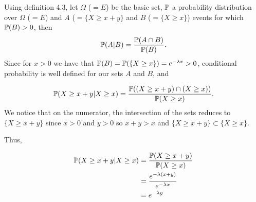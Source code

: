 
Using definition 4.3, let $ \Omega $ ($ = E$) be the basic set, $ \P$ a probability distribution over $
\Omega $ ($ =E$) and $ A$ ($ = \{ X \geq x+y \} $ and $ B$ ($ = \{ X \geq x \} $) events for which
$ \P(B) > 0$, then 
\[
    \P(A |B) = \frac{\P(A \cap B)}{\P(B)} 
.\] 
Since for $ x > 0$ we have that $ \P(B) = \P( \{ X \geq x \} ) = e^{-\lambda x} > 0 $,
conditional probability is well defined for our sets $ A$ and $ B$, and 

\[
    \P( X \geq x+y | X \geq x) = \frac{\P((X \geq x+y)\cap(X \geq x))}{\P(X \geq x) } 
.\] 
We notice that on the numerator, the intersection of the sets reduces to $ \{ X \geq x+y \} $ since
$ x > 0$ and $ y > 0$ so $ x+y > x$ and $ \{ X \geq x+y \} \subset \{ X \geq x \}  $.

Thus, 

\begin{align*}
    \P(X \geq x+y | X \geq x) &= \frac{\P(X \geq x+y)}{\P(X\geq x)}\\
			      &= \frac{e^{-\lambda(x+y)}}{e^{-\lambda x} }\\
			      &= e^{-\lambda y} 
\end{align*}
